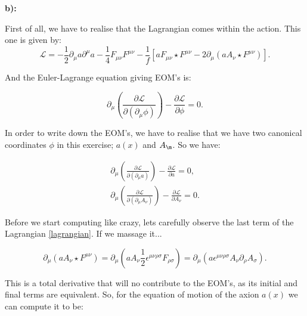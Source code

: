 \textbf{b):}

First of all, we have to realise that the Lagrangian comes within the action. This one is given by:
\begin{equation}\label{lagrangian}
	\mathcal{L}=-\frac{1}{2} \partial_{\mu} a \partial^{\mu} a-\frac{1}{4} F_{\mu \nu} F^{\mu \nu}-\frac{1}{f}\left[a F_{\mu \nu} \star F^{\mu \nu}-2 \partial_{\mu}\left(a A_{\nu} \star F^{\mu \nu}\right)\right].
\end{equation}

And the Euler-Lagrange equation giving EOM's is:

\begin{equation}
\partial_{\mu}\left(\frac{\partial \mathcal{L}}{\partial\left(\partial_{\mu} \phi\right)}\right)-\frac{\partial \mathcal{L}}{\partial \phi}=0.
\end{equation}

In order to write down the EOM's, we have to realise that we have two canonical coordinates $\phi$ in this exercise; $a(x)$ and $\vad{\m}$. So we have:

\begin{equation}
	\begin{array}{c}
		\partial_{\mu}\left(\frac{\partial \mathcal{L}}{\partial\left(\partial_{\mu} a\right)}\right)-\frac{\partial \mathcal{L}}{\partial a}=0, \\
		\partial_{\mu}\left(\frac{\partial \mathcal{L}}{\partial\left(\partial_{\mu} A_{\nu}\right)}\right)-\frac{\partial \mathcal{L}}{\partial A_{\nu}}=0.
	\end{array}
\end{equation}

Before we start computing like crazy, lets carefully observe the last term of the Lagrangian \ref{lagrangian}. If we massage it...

\begin{equation}
	\partial_{\mu}\left(a A_{\nu} \star F^{\mu \nu}\right)=\partial_{\mu}\left(a A_{\nu} \frac{1}{2} \epsilon^{\mu \nu \rho \sigma} F_{\rho \sigma}\right)=\partial_{\mu}\left(a \epsilon^{\mu \nu \rho \sigma} A_{\nu} \partial_{\rho} A_{\sigma}\right).
\end{equation}

This is a total derivative that will no contribute to the EOM's, as its initial and final terms are equivalent. So, for the equation of motion of the axion $a(x)$ we can compute it to be:

